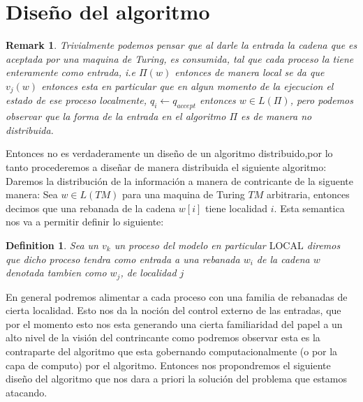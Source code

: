 \documentclass[10pt]{report}
\newtheorem*{remark}{Remark}
\newtheorem{definition}{Definition}
\begin{document}
    \section{Diseño del algoritmo}\label{sec:diseño-del-algoritmo}
    \begin{remark}
        Trivialmente podemos pensar que al darle la entrada la cadena que es aceptada por una maquina de Turing,
        es consumida, tal que cada proceso la tiene enteramente como entrada, i.e $\Pi(w)$ entonces de manera local se da
        que $v_{j}(w)$ entonces esta en particular que en algun momento de la ejecucion el estado de ese proceso localmente,
        $q_{i}\gets q_{accept}$ entonces $w\in L(\Pi)$, pero podemos observar que la forma de la entrada en el algoritmo $\Pi$
        es de manera no distribuida.
    \end{remark}
    Entonces no es verdaderamente un diseño de un algoritmo distribuido,por lo tanto procederemos a diseñar de manera
    distribuida el siguiente algoritmo:
    \space
    Daremos la distribución de la información a manera de contricante de la siguente manera:
    Sea $w\in L(TM)$ para una maquina de Turing $TM$ arbitraria, entonces decimos que una rebanada de la cadena
    $w[i]$ tiene localidad $i$.
    Esta semantica nos va a permitir definir lo siguiente:
    \theoremstyle{definition}
    \begin{definition}
        Sea un $v_{k}$ un proceso del modelo en particular $\text{LOCAL}$ diremos que dicho proceso
        tendra como entrada a una rebanada $w_{i}$ de la cadena $w$ denotada tambien como
        $w_{j}$, de localidad $j$
    \end{definition}
    En general podremos alimentar a cada proceso con una familia de rebanadas de cierta localidad.
    Esto nos da la noción del control externo de las entradas, que por el momento esto nos esta generando
    una cierta familiaridad del papel a un alto nivel de la visión del contrincante como podremos observar
    esta es la contraparte del algoritmo que esta gobernando computacionalmente (o por la capa de computo)
    por el algoritmo.
    \space
    Entonces nos propondremos el siguiente diseño del algoritmo que nos dara a priori
    la solución del problema que estamos atacando.
\end{document}
